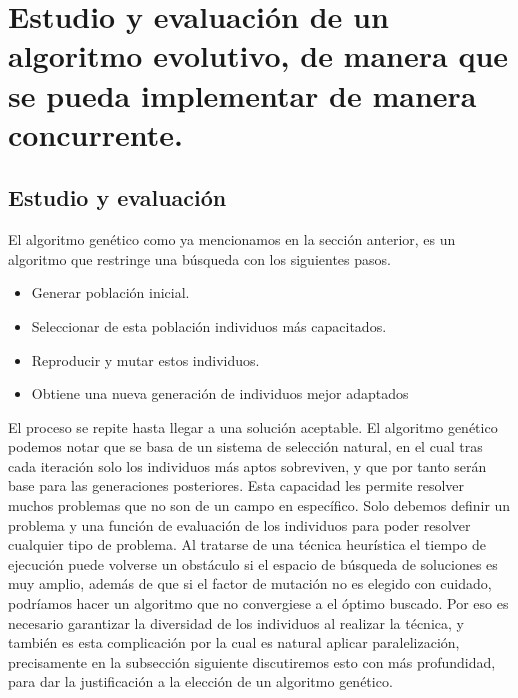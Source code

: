 \documentclass{article}
\begin{document}
\newpage 
\section{Estudio y evaluación de un algoritmo evolutivo, de manera que se pueda implementar de manera concurrente.}
\subsection{Estudio y evaluación}
El algoritmo genético como ya mencionamos en la sección anterior, es un algoritmo que restringe una búsqueda con los siguientes pasos.
\begin{itemize}
    \item Generar población inicial.
    \item Seleccionar de esta población individuos más capacitados.
    \item Reproducir y mutar estos individuos.
    \item Obtiene una nueva generación de individuos mejor adaptados
    
\end{itemize}
El proceso se repite hasta llegar a una solución aceptable.
El algoritmo genético podemos notar que se basa de un sistema de selección natural, en el cual tras cada iteración solo los individuos más aptos sobreviven, y que por tanto serán base para las generaciones posteriores.
Esta capacidad les permite resolver muchos problemas que no son de un campo en específico. Solo debemos definir un problema y una función de evaluación de los individuos para poder resolver cualquier tipo de problema. Al tratarse de una técnica heurística el tiempo de ejecución puede volverse un obstáculo si el espacio de búsqueda de soluciones es muy amplio, además de que si el factor de mutación no es elegido con cuidado, podríamos hacer un algoritmo que no convergiese a el óptimo buscado. Por eso es necesario garantizar la diversidad de los individuos al realizar la técnica, y también es esta complicación por la cual es natural aplicar paralelización, precisamente en la subsección siguiente discutiremos esto con más profundidad, para dar la justificación a la elección de un algoritmo genético.\cite{Coley (1999)}
\end{document}
